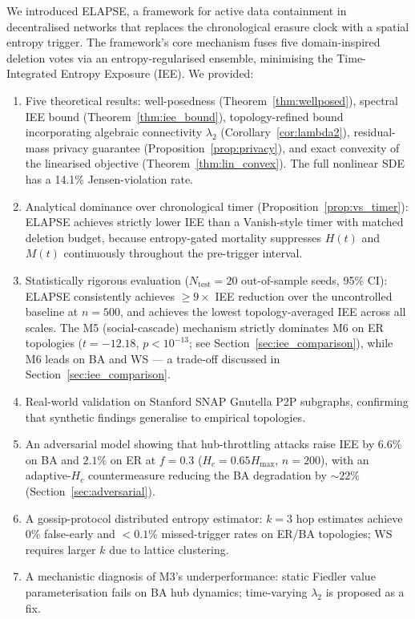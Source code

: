 \documentclass[review,12pt]{elsarticle}
\newcommand{\Hc}{H_c}
\newcommand{\Hmax}{H_{\max}}
\newcommand{\lambdat}{\lambda_2}
\begin{document}
We introduced ELAPSE, a framework for active data containment in
decentralised networks that replaces the chronological erasure clock with a
spatial entropy trigger. The framework's core mechanism fuses five
domain-inspired deletion votes via an entropy-regularised ensemble,
minimising the Time-Integrated Entropy Exposure (IEE). We provided:
\begin{enumerate}
  \item Five theoretical results: well-posedness (Theorem~\ref{thm:wellposed}),
        spectral IEE bound (Theorem~\ref{thm:iee_bound}), topology-refined
        bound incorporating algebraic connectivity $\lambda_2$
        (Corollary~\ref{cor:lambda2}), residual-mass privacy guarantee
        (Proposition~\ref{prop:privacy}), and exact convexity of the
        linearised objective (Theorem~\ref{thm:lin_convex}).
        The full nonlinear SDE has a 14.1\% Jensen-violation rate.
  \item Analytical dominance over chronological timer (Proposition~\ref{prop:vs_timer}):
        ELAPSE achieves strictly lower IEE than a Vanish-style timer with
        matched deletion budget, because entropy-gated mortality suppresses
        $H(t)$ and $M(t)$ continuously throughout the pre-trigger interval.
  \item Statistically rigorous evaluation ($N_{\mathrm{test}}=20$ out-of-sample
        seeds, 95\% CI): ELAPSE consistently achieves $\geq 9\times$ IEE
        reduction over the uncontrolled baseline at $n=500$, and achieves the
        lowest topology-averaged IEE across all scales.  The M5 (social-cascade)
        mechanism strictly dominates M6 on ER topologies
        ($t=-12.18$, $p<10^{-13}$; see Section~\ref{sec:iee_comparison}),
        while M6 leads on BA and WS — a trade-off discussed in
        Section~\ref{sec:iee_comparison}.
  \item Real-world validation on Stanford SNAP Gnutella P2P subgraphs,
        confirming that synthetic findings generalise to empirical topologies.
  \item An adversarial model showing that hub-throttling attacks raise IEE
        by $6.6\%$ on BA and $2.1\%$ on ER at $f=0.3$ ($\Hc=0.65\Hmax$,
        $n=200$), with an adaptive-$\Hc$ countermeasure reducing the BA
        degradation by $\sim 22\%$ (Section~\ref{sec:adversarial}).
  \item A gossip-protocol distributed entropy estimator: $k=3$ hop estimates
        achieve 0\% false-early and $<0.1\%$ missed-trigger rates on ER/BA
        topologies; WS requires larger $k$ due to lattice clustering.
  \item A mechanistic diagnosis of M3's underperformance: static Fiedler
        value parameterisation fails on BA hub dynamics; time-varying $\lambdat$
        is proposed as a fix.
\end{enumerate}
\end{document}
